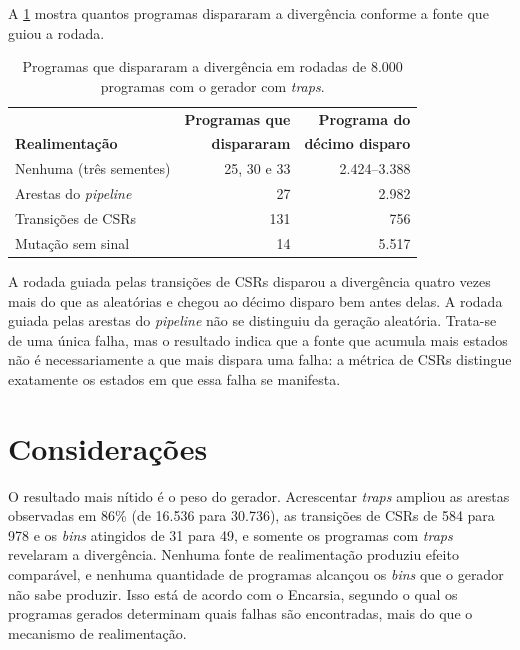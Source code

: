 A \cref{tab:bug} mostra quantos programas dispararam a divergência conforme a fonte que guiou a rodada.

\begin{table}[htbp]
    \centering
    \caption{Programas que dispararam a divergência em rodadas de 8.000 programas com o gerador com \textit{traps}.}
    \label{tab:bug}
    \small
    \setlength{\tabcolsep}{10pt}
    \renewcommand{\arraystretch}{1.2}
    \begin{tabular}{@{}lrr@{}}
        \toprule
        & \textbf{Programas que} & \textbf{Programa do} \\
        \textbf{Realimentação} & \textbf{dispararam} & \textbf{décimo disparo} \\
        \midrule
        Nenhuma (três sementes) & 25, 30 e 33 & 2.424--3.388 \\
        Arestas do \textit{pipeline} & 27 & 2.982 \\
        Transições de CSRs & 131 & 756 \\
        Mutação sem sinal & 14 & 5.517 \\
        \bottomrule
    \end{tabular}
\end{table}

A rodada guiada pelas transições de CSRs disparou a divergência quatro vezes mais do que as aleatórias e chegou ao décimo disparo bem antes delas. A rodada guiada pelas arestas do \textit{pipeline} não se distinguiu da geração aleatória. Trata-se de uma única falha, mas o resultado indica que a fonte que acumula mais estados não é necessariamente a que mais dispara uma falha: a métrica de CSRs distingue exatamente os estados em que essa falha se manifesta.

\section{Considerações}\label{sec:previo-remarks}

O resultado mais nítido é o peso do gerador. Acrescentar \textit{traps} ampliou as arestas observadas em 86\% (de 16.536 para 30.736), as transições de CSRs de 584 para 978 e os \textit{bins} atingidos de 31 para 49, e somente os programas com \textit{traps} revelaram a divergência. Nenhuma fonte de realimentação produziu efeito comparável, e nenhuma quantidade de programas alcançou os \textit{bins} que o gerador não sabe produzir. Isso está de acordo com o Encarsia, segundo o qual os programas gerados determinam quais falhas são encontradas, mais do que o mecanismo de realimentação.


